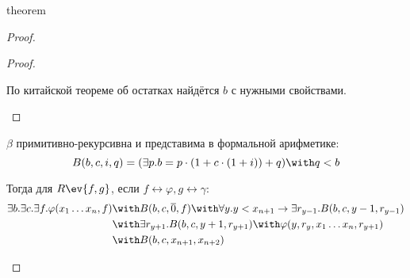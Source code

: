 \begin{subtheorem}{theorem}
\begin{proof}
\begin{enumerate}
\begin{proof}
                      \begin{statement}
                          По китайской теореме об остатках найдётся \(b\) с нужными свойствами.
                      \end{statement}
                  \end{proof}

                  \(\beta\) примитивно-рекурсивна и представима в формальной арифметике:
                  \[B(b, c, i, q) = (\exists p.b = p\cdot(1 + c \cdot (1 + i)) + q) \with q < b\]

                  Тогда для \(R\ev{f, g}\), если \(f \leftrightarrow \varphi, g \leftrightarrow \gamma\):
                  \begin{align*}
                      \exists b.\exists c.\exists f.\varphi(x_1 \dots x_n, f) & \with B(b, c, \overline 0, f) \with \forall y.y < x_{n+1} \to \exists r_{y - 1}.B(b, c, y - 1, r_{y - 1}) \\
                                                                              & \with \exists r_{y+1}.B(b,c,y + 1,r_{y+1}) \with \varphi(y, r_y, x_1 \dots x_n, r_{y+1})                  \\
                                                                              & \with B(b, c, x_{n+1}, x_{n + 2})
                  \end{align*}
        \end{enumerate}
    \end{proof}
\end{subtheorem}
\setcounter{theorem}{26}